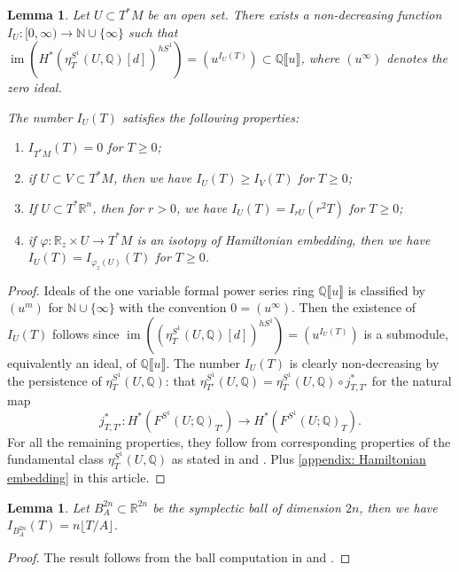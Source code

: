 \documentclass[11pt]{amsart}
\numberwithin{equation}{section}
\theoremstyle{plain}
\newtheorem{Lemma}[lemma]{Lemma}
\theoremstyle{definition}
\theoremstyle{remark}
\newcommand{\bQ} { {\mathbb{Q}}}
\newcommand{\bR} { {\mathbb{R}}}
\newcommand{\fpw}[1]{{\llbracket #1\rrbracket}}
\newcommand\im{ {\operatorname{im}} }
\begin{document}
\begin{Lemma}\label{lemma: image index property}Let $U\subset T^*M$ be an open set. There exists a non-decreasing function $I_U :[0,\infty)\to \mathbb{N}\cup\{\infty\}$ such that $\im(H^*(\eta^{S^1}_T(U,\bQ)[d])^{hS^1})=(u^{I_U(T)}) \subset \bQ\fpw{u}$, where $(u^{\infty})$ denotes the zero ideal. 

The number $I_U(T)$ satisfies the following properties: 
\begin{enumerate}
\item $I_{T^*M}(T)=0$ for $T\geq 0$; 
\item if $U\subset V\subset T^*M$, then we have $I_U(T)\geq I_V(T)$ for $T\geq 0$; 
\item If $U\subset T^*\bR^n$, then for $r>0$, we have $I_{U}(T)=I_{rU}(r^2T)$ for $T\geq 0$;
\item if $\varphi:\bR_z\times U\to T^*M$ is an isotopy of Hamiltonian embedding, then we have $I_U(T)= I_{\varphi_z(U)}(T)$ for $T\geq 0$. 
\end{enumerate}
\end{Lemma}
\begin{proof}Ideals of the one variable formal power series ring $\bQ\fpw{u}$ is classified by $(u^m)$ for $\mathbb{N}\cup\{\infty\}$ with the convention $0=(u^{\infty})$. Then the existence of $I_U(T)$ follows since $\im((\eta^{S^1}_T(U,\bQ)[d])^{hS^1})=(u^{I_U(T)}) $ is a submodule, equivalently an ideal, of $\bQ\fpw{u}$. The number $I_U(T)$ is clearly non-decreasing by the persistence of $\eta^{S^1}_T(U,\bQ)$: that $\eta^{S^1}_{T'}(U,\bQ) = \eta^{S^1}_T(U,\bQ) \circ j_{T,T'}^*$ for the natural map 
\[j_{T,T'}^*: H^*(F^{S^1}(U;\bQ)_{T'}) \to H^*(F^{S^1}(U;\bQ)_T).\]
For all the remaining properties, they follow from corresponding properties of the fundamental class $\eta^{S^1}_T(U,\bQ)$ as stated in \cite{Capacities2021} and \cite[Section 3.9]{CyclicZHANG}. Plus \autoref{appendix: Hamiltonian embedding} in this article.\end{proof}

\begin{Lemma}\label{lem: symplectic ball}Let $B_{A}^{2n} \subset \bR^{2n}$ be the symplectic ball of dimension $2n$, then we have $I_{B_{A}^{2n}}(T)=n\lfloor T /A\rfloor$.    
\end{Lemma}
\begin{proof}The result follows from the ball computation in \cite{Capacities2021} and \cite[Section 3.9]{CyclicZHANG}.
\end{proof}
\end{document}
